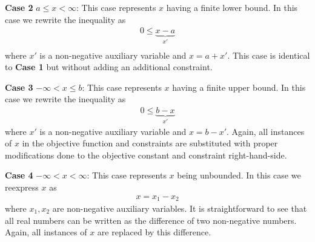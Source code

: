 \documentclass{article}
\begin{document}
\textbf{Case 2 } $a \leq x < \infty$: This case represents $x$ having a finite lower bound. In this case we rewrite the inequality as 
\begin{align*}
    0 \leq \underbrace{x - a}_{x'} \\
\end{align*}
where $x'$ is a non-negative auxiliary variable and $x = a + x'$. This case is identical to \textbf{Case 1} but without adding an additional constraint.

\textbf{Case 3 } $-\infty < x \leq b$: This case represents $x$ having a finite upper bound. In this case we rewrite the inequality as 
\begin{align*}
    0 \leq \underbrace{b - x}_{x'}
\end{align*}
where $x'$ is a non-negative auxiliary variable and $x = b - x'$. Again, all instances of $x$ in the objective function and constraints are substituted with proper modifications done to the objective constant and constraint right-hand-side.

\textbf{Case 4 } $-\infty < x < \infty$: This case represents $x$ being unbounded. In this case we reexpress $x$ as 
\begin{align*}
    x = x_1 - x_2
\end{align*}
where $x_1, x_2$ are non-negative auxiliary variables. It is straightforward to see that all real numbers can be written as the difference of two non-negative numbers. Again, all instances of $x$ are replaced by this difference.
\end{document}
